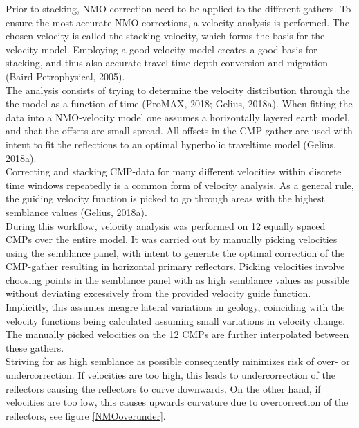 \documentclass[10pt,a4paper]{article}
\begin{document}
Prior to stacking, NMO-correction need to be applied to the different gathers. To ensure the most accurate NMO-corrections, a velocity analysis is performed. The chosen velocity is called the stacking velocity, which forms the basis for the velocity model. Employing a good velocity model creates a good basis for stacking, and thus also accurate travel time-depth conversion and migration (Baird Petrophysical, 2005).
\\
The analysis consists of trying to determine the velocity distribution through the the model as a function of time (ProMAX, 2018; Gelius, 2018a). When fitting the data into a NMO-velocity model one assumes a horizontally layered earth model, and that the offsets are small spread. All offsets in the CMP-gather are used with intent to fit the reflections to an optimal hyperbolic traveltime model (Gelius, 2018a). 
\\
Correcting and stacking CMP-data for many different velocities within discrete time windows repeatedly is a common form of velocity analysis. As a general rule, the guiding velocity function is picked to go through areas with the highest semblance values (Gelius, 2018a).
\\
During this workflow, velocity analysis was performed on 12 equally spaced CMPs over the entire model. It was carried out by manually picking velocities using the semblance panel, with intent to generate the optimal correction of the CMP-gather resulting in horizontal primary reflectors. Picking velocities involve choosing points in the semblance panel with as high semblance values as possible without deviating excessively from the provided velocity guide function. Implicitly, this assumes meagre lateral variations in geology, coinciding with the velocity functions being calculated assuming small variations in velocity change. The manually picked velocities on the 12 CMPs are further interpolated between these gathers.
\\
Striving for as high semblance as possible consequently minimizes risk of over- or undercorrection. If velocities are too high, this leads to undercorrection of the reflectors causing the reflectors to curve downwards. On the other hand, if velocities are too low, this causes upwards curvature due to overcorrection of the reflectors, see figure \ref{NMOoverunder}.
\end{document}
